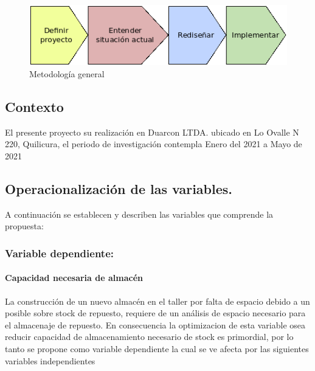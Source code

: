 \documentclass[
]{article}
\begin{document}
\begin{figure}

{\centering \includegraphics[width=0.5\linewidth]{marco teorico/diagramas/metodo_resu} 

}

\caption{Metodología general}\label{fig:unnamed-chunk-7}
\end{figure}

\hypertarget{contexto}{%
\subsection{Contexto}\label{contexto}}

El presente proyecto su realización en Duarcon LTDA. ubicado en Lo
Ovalle N 220, Quilicura, el periodo de investigación contempla Enero del
2021 a Mayo de 2021

\hypertarget{operacionalizaciuxf3n-de-las-variables.}{%
\subsection{Operacionalización de las
variables.}\label{operacionalizaciuxf3n-de-las-variables.}}

A continuación se establecen y describen las variables que comprende la
propuesta:

\hypertarget{variable-dependiente}{%
\subsubsection{Variable dependiente:}\label{variable-dependiente}}

\hypertarget{capacidad-necesaria-de-almacuxe9n}{%
\paragraph{Capacidad necesaria de
almacén}\label{capacidad-necesaria-de-almacuxe9n}}

La construcción de un nuevo almacén en el taller por falta de espacio
debido a un posible sobre stock de repuesto, requiere de un análisis de
espacio necesario para el almacenaje de repuesto. En consecuencia la
optimizacion de esta variable osea reducir capacidad de almacenamiento
necesario de stock es primordial, por lo tanto se propone como variable
dependiente la cual se ve afecta por las siguientes variables
independientes
\end{document}
